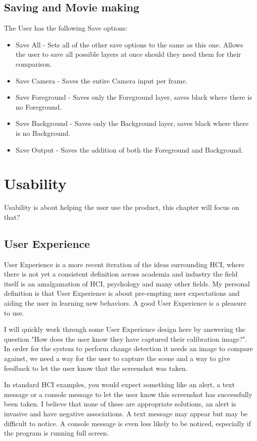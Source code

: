 \documentclass[a4paper]{report}
\begin{document}
\subsection{Saving and Movie making}
The User has the following Save options:

\begin{itemize}
\item Save All - Sets all of the other save options to the same as this one. Allows the user to save all possible layers at once should they need them for their comparison.
\item Save Camera - Saves the entire Camera input per frame.
\item Save Foreground - Saves only the Foreground layer, saves black where there is no Foreground.
\item Save Background - Saves only the Background layer, saves black where there is no Background.
\item Save Output - Saves the addition of both the Foreground and Background.
\end{itemize}

\section{Usability}
Usability is about helping the user use the product, this chapter will focus on that?

\subsection{User Experience}
User Experience is a more recent iteration of the ideas surrounding HCI, where there is not yet a consistent definition across academia and industry the field itself is an amalgamation of HCI, psychology and many other fields. My personal definition is that User Experience is about pre-empting user expectations and aiding the user in learning new behaviors. A good User Experience is a pleasure to use. 

I will quickly work through some User Experience design here by answering the question "How does the user know they have captured their calibration image?". In order for the system to perform change detection it needs an image to compare against, we need a way for the user to capture the scene and a way to give feedback to let the user know that the screenshot was taken.

In standard HCI examples, you would expect something like an alert, a text message or a console message to let the user know this screenshot has successfully been taken. I believe that none of these are appropriate solutions, an alert is invasive and have negative associations. A text message may appear but may be difficult to notice. A console message is even less likely to be noticed, especially if the program is running full screen.
\end{document}
